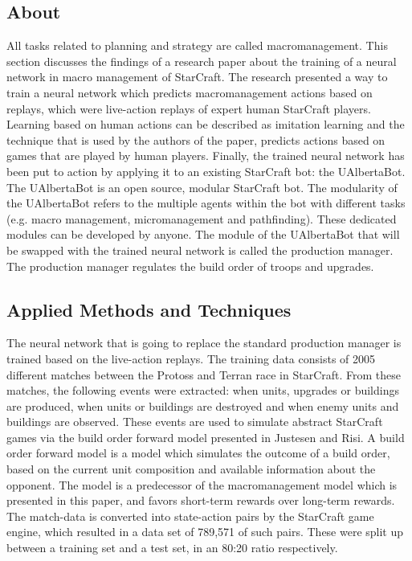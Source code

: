 \label{chapter:macro-management}

\subsection{About}
All tasks related to planning and strategy are called macromanagement. This section discusses the findings of a research paper about the training of a neural network in macro management of StarCraft. The research presented a way to train a neural network which predicts macromanagement actions based on replays, which were live-action replays of expert human StarCraft players. Learning based on human actions can be described as imitation learning and the technique that is used by the authors of the paper, predicts actions based on games that are played by human players. Finally, the trained neural network has been put to action by applying it to an existing StarCraft bot: the UAlbertaBot. The UAlbertaBot is an open source, modular StarCraft bot\citep{churchill2015ualbertabot}. The modularity of the UAlbertaBot refers to the multiple agents within the bot with different tasks (e.g. macro management, micromanagement and pathfinding). These dedicated modules can be developed by anyone\citep{ontanon2013survey}. The module of the UAlbertaBot that will be swapped with the trained neural network is called the production manager. The production manager regulates the build order of troops and upgrades.

\subsection{Applied Methods and Techniques}

The neural network that is going to replace the standard production manager is trained based on the live-action replays. The training data consists of 2005 different matches between the Protoss and Terran race in StarCraft. From these matches, the following events were extracted: when units, upgrades or buildings are produced, when units or buildings are destroyed and when enemy units and buildings are observed. These events are used to simulate abstract StarCraft games via the build order forward model presented in Justesen and Risi\citep{justesen2017continual}. A build order forward model is a model which simulates the outcome of a build order, based on the current unit composition and available information about the opponent. The model is a predecessor of the macromanagement model which is presented in this paper, and favors short-term rewards over long-term rewards. The match-data is converted into state-action pairs by the StarCraft game engine, which resulted in a data set of 789,571 of such pairs. These were split up between a training set and a test set, in an 80:20 ratio respectively.

